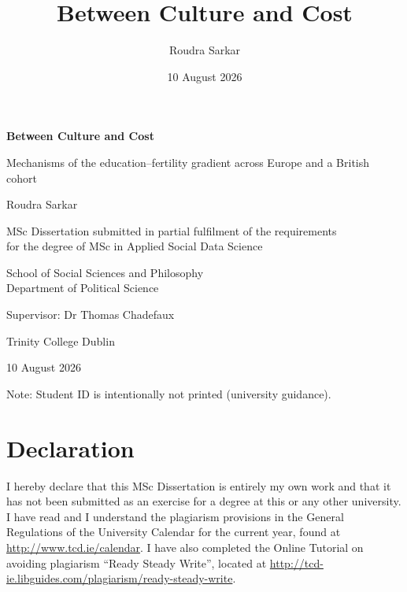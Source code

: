 \documentclass[12pt,a4paper]{report}
\title{Between Culture and Cost}
\author{Roudra Sarkar}
\date{10 August 2026}
\begin{document}
\begin{titlepage}
\centering
\vspace*{2.5cm}
{\LARGE\bfseries Between Culture and Cost\par}
\vspace{0.6cm}
{\large Mechanisms of the education--fertility gradient across Europe and a British cohort\par}
\vfill
{\large Roudra Sarkar\par}
\vspace{1.4cm}
{\normalsize MSc Dissertation submitted in partial fulfilment of the requirements\\
for the degree of MSc in Applied Social Data Science\par}
\vspace{1.0cm}
{\normalsize School of Social Sciences and Philosophy\\
Department of Political Science\par}
\vspace{1.0cm}
{\normalsize Supervisor: Dr Thomas Chadefaux\par}
\vspace{1.4cm}
{\normalsize Trinity College Dublin\par}
\vspace{0.4cm}
{\normalsize 10 August 2026\par}
\vfill
{\footnotesize Note: Student ID is intentionally not printed (university guidance).\par}
\end{titlepage}


\chapter*{Declaration}
I hereby declare that this MSc Dissertation is entirely my own work and that it has not
been submitted as an exercise for a degree at this or any other university. I have read
and I understand the plagiarism provisions in the General Regulations of the University
Calendar for the current year, found at \url{http://www.tcd.ie/calendar}. I have also
completed the Online Tutorial on avoiding plagiarism ``Ready Steady Write'', located at
\url{http://tcd-ie.libguides.com/plagiarism/ready-steady-write}.
\end{document}
